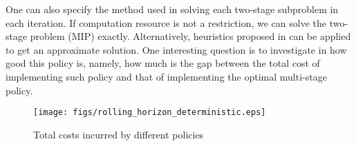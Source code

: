 \documentclass[10pt]{article}
\theoremstyle{plain}
\theoremstyle{definition}
\theoremstyle{remark}
\begin{document}
One can also specify the method used in solving each two-stage subproblem in each iteration.
If computation resource is not a restriction, we can solve the two-stage problem (MIP) exactly.
Alternatively, heuristics proposed in \cite{HA2009} can be applied to get an approximate solution.
{\color{rred}One interesting question is to investigate in how good this policy is, namely, how much is the
gap between the total cost of implementing such policy and that of implementing the optimal
multi-stage policy.}

\begin{table}[h]
\begin{center}
\end{center}
\vskip -0.4cm
\caption{Total costs incurred by different policies (unit: million dollars)}
\label{tb1:policy_test_deterministic}
\end{table}

\begin{figure}[h!]
\begin{center}
\texttt{[image: figs/rolling\_horizon\_deterministic.eps]}
\end{center}
\vskip -0.5cm
\caption{Total costs incurred by different policies}
\label{f1:policy_test_deterministic}
\end{figure}
\end{document}
